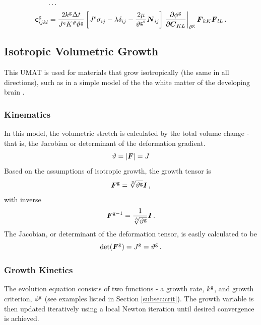 \documentclass[10pt,letterpaper,oneside]{report}
\newcommand{\ten}[1]{\mbox{\boldmath $#1$}{}}
\newcommand{\tenf}[1]{\mbox{{\sffamily{\bfseries {#1}}}}}
\newcommand{\scas}[1]{\mbox{{\scriptsize{${\rm{#1}}$}}}{}}
\begin{document}
\begin{itemize}
\begin{align}
\cdots{}& \notag \\
\tenf{c}^{\scas{g}}_{ijkl} ={}& \frac{2 k^{\scas{g}} \Delta t}{J^{\scas{e}} K^\vartheta \vartheta^{\scas{g}}} \left[ J^{\scas{e}} \sigma_{ij} - \lambda \delta_{ij}
- \frac{2 \mu}{\vartheta^{\scas{g}^2}} \ten{N}_{ij} \right] 
\left. \frac{\partial \phi^{\scas{g}} }{\partial \ten{C}_{KL}} \right|_{\vartheta^{\scas{g}}} \ten{F}_{kK} \ten{F}_{lL} \, . 
\label{growth_tangent_fiber}
\end{align}


\subsection{Isotropic Volumetric Growth}
This UMAT is used for materials that grow isotropically (the same in all directions), such as in a simple model of the the white matter of the developing brain \cite{Holland2015}.  

\subsubsection{Kinematics}
In this model, the volumetric stretch is calculated by the total volume change - that is, the Jacobian or determinant of the deformation gradient.
\begin{equation}
\vartheta = | \ten{F} | = J
\end{equation}
Based on the assumptions of isotropic growth, the growth tensor is
\begin{equation}
\ten{F}^{\scas{g}} = \sqrt[3]{\vartheta^{\scas{g}}} \ten{I} \, , 
\end{equation}
with inverse 
\begin{equation}
\ten{F}^{\scas{g}-1} = \frac{1}{ \sqrt[3]{\vartheta^{\scas{g}}} } \ten{I} \, . 
\end{equation}
The Jacobian, or determinant of the deformation tensor, is easily calculated to be
\begin{equation}
\det (\ten{F}^{\scas{g}}) = J^{\scas{g}} = \vartheta^{\scas{g}} \, . 
\end{equation}

\subsubsection{Growth Kinetics}
The evolution equation consists of two functions - a growth rate, $k^{\scas{g}}$, and growth criterion, $\phi^{\scas{g}}$ (see examples listed in Section \ref{subsec:crit}).  The growth variable is then updated iteratively using a local Newton iteration until desired convergence is achieved.


\end{itemize}
\end{document}
